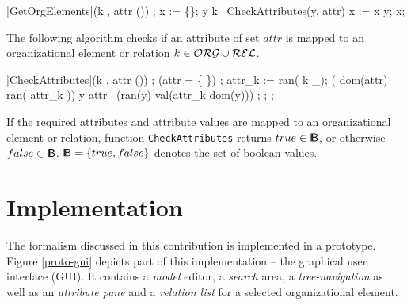 	\begin{samepage}
	{\small
	\NumberProgramstrue
	\begin{algorithm}[GetOrgElements]\label{alg:GetOrgElements}
	\begin{program}
	\FUNCT |GetOrgElements|(k \subset \OrgElementMenge \cup \relationen, attr \subset (\Bezeichner \times \WerteMenge)) \subset \OrgElementMenge \cup \relationen 
	\BEGIN
	\var {};
	x := \{\};
	\FOREACH y \in k~\DO
		\IF CheckAttributes(y, attr)
		\THEN 
			x := x \cup y;
		\FI
	\OD
	\RETURN \quad x;
	\END
	\end{program}
	\end{algorithm}
	\NumberProgramsfalse
	}
	\end{samepage}
	
\noindent The following algorithm checks if an attribute of set $attr$ is mapped to an organizational element or relation $k \in \mathcal{ORG} \cup \mathcal{REL}$.
	
	\begin{samepage}
	{\small
	\NumberProgramstrue
	\begin{algorithm}[CheckAttributes]\label{alg:CheckAttributes}
	\begin{program}
	\FUNCT |CheckAttributes|(k \in \OrgElementMenge \cup \relationen, attr \subset (\Bezeichner \times \WerteMenge)) \subset \boole 
	\BEGIN
	\var \seq{attr_k \subset \attribute};
	\IF (attr = \{ \}) 
		\THEN \RETURN \quad \true;
	\ELSE
		attr_k := ran( k \lhd \rel_{\attribute});
		\IF ( dom(attr) \subset ran( attr_k )) 
		\THEN
			\FOREACH y \in attr~\DO
				\IF (ran(y) \neq val(attr_k \rhd dom(y))) 
				\THEN \RETURN \quad \false; 
				\FI
			\OD
			\RETURN \quad \true;
		\ELSE \RETURN \quad \false;
		\FI
	\FI
	\END
	\end{program}
	\end{algorithm}
	\NumberProgramsfalse
	}
	\end{samepage}

\noindent If the required attributes and attribute values are mapped to an organizational element or relation, function {\tt CheckAttributes} returns $true \in { \sf I\!B}$, or otherwise $false \in { \sf I\!B}$. ${ \sf I\!B} = \{ true, false \}$ denotes the set of boolean values.

\section{Implementation}
The formalism discussed in this contribution is implemented in a prototype. Figure \ref{proto-gui} depicts part of this implementation -- the graphical user interface (GUI). It contains a \emph{model} editor, a \emph{search} area, a \emph{tree-navigation} as well as an \emph{attribute pane} and a \emph{relation list} for a selected organizational element.

